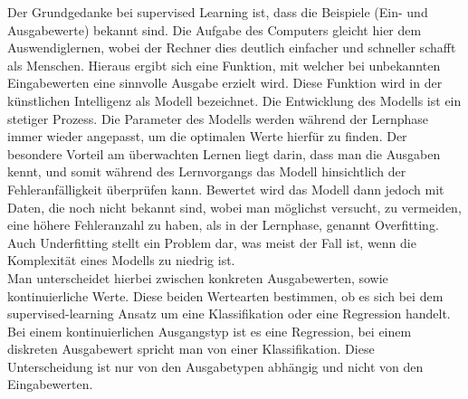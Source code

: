 Der Grundgedanke bei supervised Learning ist, dass die Beispiele (Ein- und
Ausgabewerte) bekannt sind. Die Aufgabe des Computers gleicht hier dem
Auswendiglernen, wobei der Rechner dies deutlich einfacher und schneller
schafft als Menschen. Hieraus ergibt sich eine Funktion, mit welcher bei
unbekannten Eingabewerten eine sinnvolle Ausgabe erzielt wird. Diese Funktion
wird in der künstlichen Intelligenz als Modell bezeichnet. Die Entwicklung des
Modells ist ein stetiger Prozess. Die Parameter des Modells werden während der
Lernphase immer wieder angepasst, um die optimalen Werte hierfür zu finden. Der
besondere Vorteil am überwachten Lernen liegt darin, dass man die Ausgaben
kennt, und somit während des Lernvorgangs das Modell hinsichtlich der
Fehleranfälligkeit überprüfen kann. Bewertet wird das Modell dann jedoch mit
Daten, die noch nicht bekannt sind, wobei man möglichst versucht, zu vermeiden,
eine höhere Fehleranzahl zu haben, als in der Lernphase, genannt Overfitting.
Auch Underfitting stellt ein Problem dar, was meist der Fall ist, wenn die
Komplexität eines Modells zu niedrig ist.\cite{lanquillon2019grundzuge}\\ 
Man unterscheidet hierbei zwischen konkreten Ausgabewerten, sowie kontinuierliche
Werte. Diese beiden Wertearten bestimmen, ob es sich bei dem
supervised-learning Ansatz um eine Klassifikation oder eine Regression handelt.
Bei einem kontinuierlichen Ausgangstyp ist es eine Regression, bei einem
diskreten Ausgabewert spricht man von einer Klassifikation. Diese
Unterscheidung ist nur von den Ausgabetypen abhängig und nicht von den
Eingabewerten.\cite{matzka2021unuberwachtes}\\